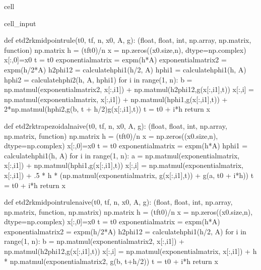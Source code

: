 \documentclass[letterpaper,10pt,english]{jupyterBook}
\begin{document}
\begin{sphinxuseclass}{cell}
\begin{sphinxVerbatimInput}
\begin{sphinxuseclass}{cell_input}
\begin{sphinxVerbatim}[commandchars=\\\{\}]
def etd2rk\PYGZus{}midpoint\PYGZus{}rule(t0, tf, n, x0, A, g):
    \PYGZsq{}\PYGZsq{}\PYGZsq{}(float, float, int, np.array, np.matrix, function) \PYGZhy{}\PYGZgt{} np.matrix\PYGZsq{}\PYGZsq{}\PYGZsq{}
    h = (tf\PYGZhy{}t0)/n
    x = np.zeros((x0.size,n), dtype=np.complex\PYGZus{})
    x[:,0]=x0
    t = t0
    exponential\PYGZus{}matrix = expm(\PYGZhy{}h*A)
    exponential\PYGZus{}matrix\PYGZus{}2 = expm(\PYGZhy{}h/2*A)
    h\PYGZus{}2phi1\PYGZus{}2 = calculate\PYGZus{}hphi1(h/2, A)
    hphi1 = calculate\PYGZus{}hphi1(h, A)
    hphi2 = calculate\PYGZus{}hphi2(h, A, hphi1)
    for i in range(1, n):
        b = np.matmul(exponential\PYGZus{}matrix\PYGZus{}2, x[:,i\PYGZhy{}1]) + np.matmul(h\PYGZus{}2phi1\PYGZus{}2,g(x[:,i\PYGZhy{}1],t))
        x[:,i] = np.matmul(exponential\PYGZus{}matrix, x[:,i\PYGZhy{}1]) + np.matmul(hphi1,g(x[:,i\PYGZhy{}1],t)) + 2*np.matmul(hphi2,g(b, t + h/2)\PYGZhy{}g(x[:,i\PYGZhy{}1],t))
        t = t0 + i*h
    return x

def etd2rk\PYGZus{}trapezoidal\PYGZus{}naive(t0, tf, n, x0, A, g):
    \PYGZsq{}\PYGZsq{}\PYGZsq{}(float, float, int, np.array, np.matrix, function) \PYGZhy{}\PYGZgt{} np.matrix\PYGZsq{}\PYGZsq{}\PYGZsq{}
    h = (tf\PYGZhy{}t0)/n
    x = np.zeros((x0.size,n), dtype=np.complex\PYGZus{})
    x[:,0]=x0
    t = t0
    exponential\PYGZus{}matrix = expm(\PYGZhy{}h*A)
    hphi1 = calculate\PYGZus{}hphi1(h, A)
    for i in range(1, n):
        a = np.matmul(exponential\PYGZus{}matrix, x[:,i\PYGZhy{}1]) + np.matmul(hphi1,g(x[:,i\PYGZhy{}1],t))
        x[:,i] = np.matmul(exponential\PYGZus{}matrix, x[:,i\PYGZhy{}1]) + .5 * h * (np.matmul(exponential\PYGZus{}matrix, g(x[:,i\PYGZhy{}1],t)) + g(a, t0 + i*h))
        t = t0 + i*h
    return x

def etd2rk\PYGZus{}midpoint\PYGZus{}rule\PYGZus{}naive(t0, tf, n, x0, A, g):
    \PYGZsq{}\PYGZsq{}\PYGZsq{}(float, float, int, np.array, np.matrix, function, np.matrix) \PYGZhy{}\PYGZgt{} np.matrix\PYGZsq{}\PYGZsq{}\PYGZsq{}
    h = (tf\PYGZhy{}t0)/n
    x = np.zeros((x0.size,n), dtype=np.complex\PYGZus{})
    x[:,0]=x0
    t = t0
    exponential\PYGZus{}matrix = expm(\PYGZhy{}h*A)
    exponential\PYGZus{}matrix\PYGZus{}2 = expm(\PYGZhy{}h/2*A)
    h\PYGZus{}2phi1\PYGZus{}2 = calculate\PYGZus{}hphi1(h/2, A)
    for i in range(1, n):
        b = np.matmul(exponential\PYGZus{}matrix\PYGZus{}2, x[:,i\PYGZhy{}1]) + np.matmul(h\PYGZus{}2phi1\PYGZus{}2,g(x[:,i\PYGZhy{}1],t))
        x[:,i] = np.matmul(exponential\PYGZus{}matrix, x[:,i\PYGZhy{}1]) + h * np.matmul(exponential\PYGZus{}matrix\PYGZus{}2, g(b, t+h/2))
        t = t0 + i*h
    return x


\end{sphinxVerbatim}
\end{sphinxuseclass}
\end{sphinxVerbatimInput}
\end{sphinxuseclass}
\end{document}
